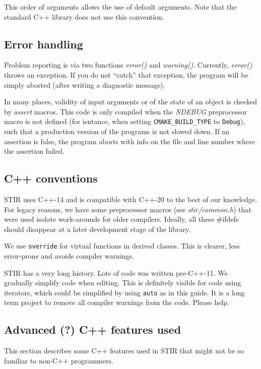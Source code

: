\documentclass{article}
\begin{document}
This order of arguments allows the use of default arguments. 
Note that the standard C++ library does not use this convention.

\subsection{
Error handling }

Problem reporting is via two functions \textit{error()} and \textit{warning()}. 
Currently, \textit{error()} throws an exception. If you do not ``catch'' that
exception, the program will be simply aborted (after writing 
a diagnostic message). 

In many places, validity of input arguments or of the state of 
an object is checked by \textit{assert} macros. This code is only 
compiled when the \textit{NDEBUG} preprocessor macro is not defined (for isntance,
when setting \texttt{CMAKE\_BUILD\_TYPE} to \texttt{Debug}), 
such that a production version of the programs 
is not slowed down. If an assertion is false, the program aborts 
with info on the file and line number where the assertion failed.

\subsection{C++ conventions}
STIR uses C++-14 and is compatible with C++-20 to the best of our knowledge.
For legacy reasons, we have some preprocessor 
macros (see \textit{stir/common.h}) that were used isolate work-arounds for older 
compilers. Ideally, all these \#ifdefs should disappear at a 
later development stage of the library.

We use \texttt{override} for virtual functions in derived classes. This is clearer,
less error-prone and avoids compiler warnings.

STIR has a very long history. Lots of code was written pre-C++-11. We gradually simplify
code when editing. This is definitely visible for code using iterators, which could be
simplified by using \texttt{auto} as in this guide. It is a long term project to
remove all compiler warnings from the code. Please help.

\subsection{\label{ssect:AdvancedCppFeatures}
Advanced (?) C++ features used}


This section describes some C++ features used in STIR that might not be so familiar to
non-C++ programmers.
\end{document}
